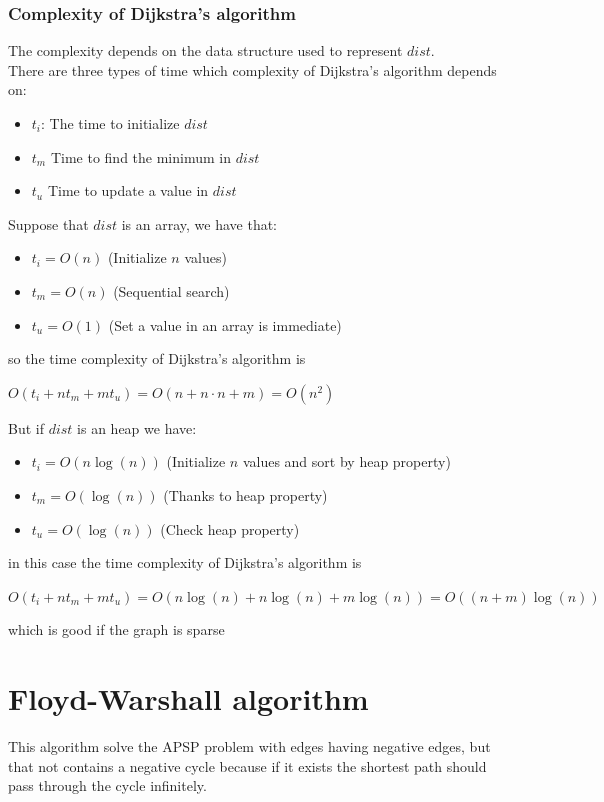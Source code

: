 \documentclass[10pt,a4paper]{book}
\begin{document}
	\subsection{Complexity of Dijkstra's algorithm}
	The complexity depends on the data structure used to represent $ dist $.\\
	There are three types of time which complexity of Dijkstra's algorithm depends on:
	\begin{itemize}
		\item $ t_i $: The time to initialize $ dist $
		\item $ t_m $ Time to find the minimum in $ dist $
		\item $ t_u $ Time to update a value in $ dist $
	\end{itemize}
	Suppose that $ dist $ is an array, we have that:
	\begin{itemize}
		\item $ t_i = O(n) $ (Initialize $ n $ values) 
		\item $ t_m  = O(n)$ (Sequential search)
		\item $ t_u  = O(1)$ (Set a value in an array is immediate)
	\end{itemize}
		so the time complexity of Dijkstra's algorithm is 
		\begin{center}
			$ O(t_i + n t_m + m t_u)  = O(n + n\cdot n + m) = O(n^2) $ 
		\end{center}
		But if $ dist $ is an heap we have:
		\begin{itemize}
		\item $ t_i = O(n \log(n)) $ (Initialize $ n $ values and sort by heap property) 
		\item $ t_m  = O(\log(n))$ (Thanks to heap property)
		\item $ t_u  = O(\log(n))$ (Check heap property)
		\end{itemize}
		in this case the time complexity of Dijkstra's algorithm is 
		\begin{center}
			$ O(t_i + n t_m + m t_u)  = O(n \log(n)+ n \log(n) + m \log(n)) = O((n+m) \log(n)) $ 
		\end{center}
		which is good if the graph is sparse
		\chapter{Floyd-Warshall algorithm}
		This algorithm solve the APSP problem with  edges having negative edges, but that not contains a negative cycle because if it exists the shortest path should pass through the cycle infinitely.
\end{document}
